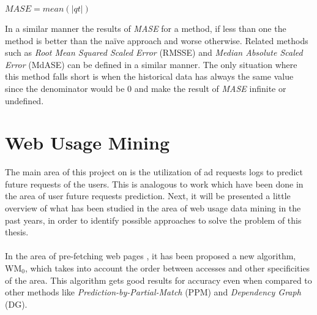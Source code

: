 \begin{center}
\Large
\begin{math}
  MASE = mean(\left|qt\right|)
\end{math}
\normalsize
\end{center}

In a similar manner the results of \emph{MASE} for a method, if less than one
the method is better than the na\"{i}ve approach and worse otherwise.
Related methods such as \emph{Root Mean Squared Scaled Error} (RMSSE) and
\emph{Median Absolute Scaled Error} (MdASE) can be defined in a similar manner.
The only situation where this method falls short is when the historical data has
always the same value since the denominator would be 0 and make the result of
\emph{MASE} infinite or undefined.


\section{Web Usage Mining}\label{sec:network}

\nocite{UjwalaPatil}

The main area of this project on is the utilization of ad requests logs
to predict future requests of the users. This is analogous to work which have
been done in the area of user future requests prediction. Next, it will be
presented a little overview of what has been studied in the area of web usage
data mining in the past years, in order to identify possible approaches to solve
the problem of this thesis.

\paragraph{}

In the area of pre-fetching web pages \cite{Nanopoulos01effectiveprediction}, it
has been proposed a new algorithm, WM\begin{math}_0\end{math}, which takes into
  account the order between accesses and other specificities of the area. This
  algorithm gets good results for accuracy even when compared to other methods
  like \emph{Prediction-by-Partial-Match} (PPM) and \emph{Dependency Graph}
  (DG).

\paragraph{}

